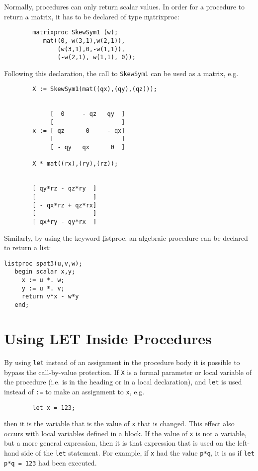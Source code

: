 Normally, procedures can only return scalar values. In order for a procedure to
return a matrix, it has to be declared of
type \k{matrixproc}:
\begin{verbatim}
        matrixproc SkewSym1 (w);
           mat((0,-w(3,1),w(2,1)),
               (w(3,1),0,-w(1,1)),
               (-w(2,1), w(1,1), 0));
\end{verbatim}
Following this declaration, the call to \texttt{SkewSym1} can be used as a matrix, e.g.
\begin{verbatim}
        X := SkewSym1(mat((qx),(qy),(qz)));


             [  0     - qz   qy  ]
             [                   ]
        x := [ qz      0     - qx]
             [                   ]
             [ - qy   qx      0  ]

        X * mat((rx),(ry),(rz));


        [ qy*rz - qz*ry  ]
        [                ]
        [ - qx*rz + qz*rx]
        [                ]
        [ qx*ry - qy*rx  ]
\end{verbatim}
\hypertarget{reserved:LISTPROC}{}
Similarly, by using the keyword \k{listproc}, an algebraic
procedure can be declared to return a list:
\begin{verbatim}
listproc spat3(u,v,w);
   begin scalar x,y;
     x := u *. w;
     y := u *. v;
     return v*x - w*y
   end;
\end{verbatim}


\section{Using LET Inside Procedures}

By using \texttt{let} instead of an assignment in the procedure
body it is possible to bypass the call-by-value
 protection.  If \texttt{X} is a formal parameter or local
variable of the procedure (i.e. is in the heading or in a local
declaration), and \texttt{let} is used instead of \texttt{:=} to make an
assignment to \texttt{x}, e.g.

\begin{verbatim}
        let x = 123;
\end{verbatim}
then it is the variable that is the value of \texttt{x} that is changed.
This effect also occurs with local variables defined in a block.  If the
value of \texttt{x} is not a variable, but a more general expression, then it
is that expression that is used on the left-hand side of the \texttt{let}
statement.  For example, if \texttt{x} had the value \texttt{p*q}, it is as if
\texttt{let p*q = 123} had been executed.

